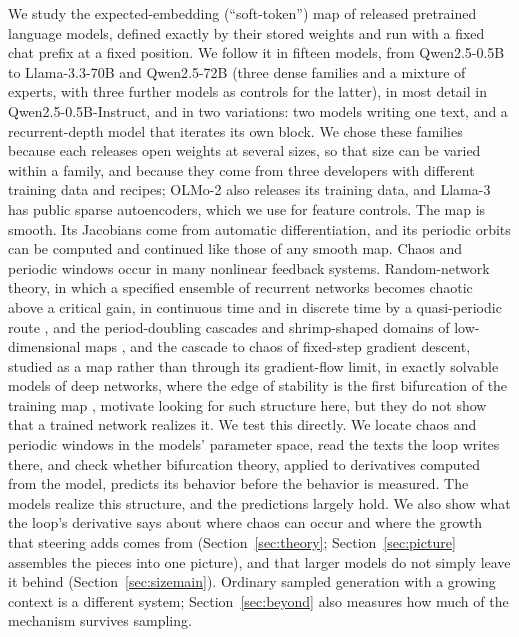 \documentclass[11pt,letterpaper]{article}
\begin{document}
We study the expected-embedding (``soft-token'') map of released pretrained language models, defined exactly by
their stored weights and run with a fixed chat prefix at a fixed position. We follow it in fifteen models, from
Qwen2.5-0.5B to Llama-3.3-70B and Qwen2.5-72B (three dense families and a mixture of experts, with three further models as controls for the latter), in most detail in
Qwen2.5-0.5B-Instruct, and in two variations: two models writing one text, and a recurrent-depth model that iterates
its own block. We chose these families because each releases open weights at several sizes, so that size can be varied within a family, and because they come from three developers with different training data and recipes; OLMo-2 also releases its training data, and Llama-3 has public sparse autoencoders, which we use for feature controls. The map is smooth. Its
Jacobians come from automatic differentiation, and its periodic orbits can be computed and continued like those of
any smooth map. Chaos and periodic windows occur in many nonlinear feedback systems. Random-network theory, in which
a specified ensemble of recurrent networks becomes chaotic above a critical gain, in continuous time
\cite{sompolinsky1988chaos} and in discrete time by a quasi-periodic route \cite{doyon1994bifurcations}, and the
period-doubling cascades and shrimp-shaped domains of low-dimensional maps \cite{feigenbaum1978quantitative,gallas1993structure},
and the cascade to chaos of fixed-step gradient descent, studied as a map rather than through its gradient-flow limit, in
exactly solvable models of deep networks, where the edge of stability is the first bifurcation of the training map
\cite{hofmann2026map}, motivate looking for such structure here, but they do not show that a trained network realizes it. We test this
directly. We locate chaos and periodic windows in the models' parameter space, read the texts the loop writes there,
and check whether bifurcation theory, applied to derivatives computed from the model, predicts its behavior before
the behavior is measured. The models realize this structure, and the predictions largely hold. We also show what the loop's derivative says about where chaos can occur and where the growth that steering adds comes from (Section~\ref{sec:theory}; Section~\ref{sec:picture} assembles the pieces into one picture), and that larger models do not simply leave it behind (Section~\ref{sec:sizemain}). Ordinary sampled generation with a growing context is a different
system; Section~\ref{sec:beyond} also measures how much of the mechanism survives sampling.
\end{document}
